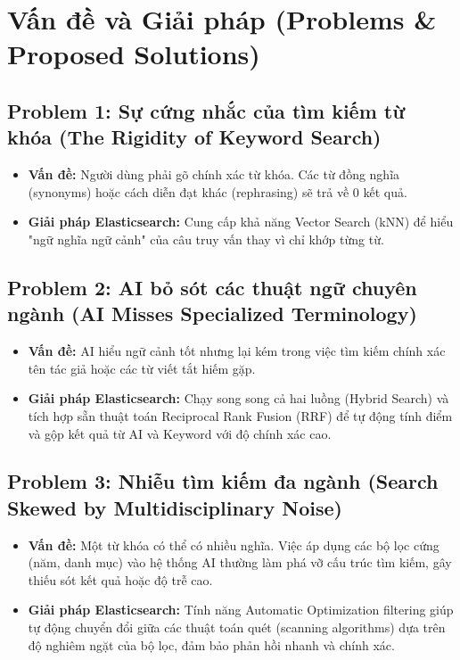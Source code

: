 \chapter{Vấn đề và Giải pháp (Problems \& Proposed Solutions)}

\section{Problem 1: Sự cứng nhắc của tìm kiếm từ khóa (The Rigidity of Keyword Search)}
\begin{itemize}
    \item \textbf{Vấn đề:} Người dùng phải gõ chính xác từ khóa. Các từ đồng nghĩa (synonyms) hoặc cách diễn đạt khác (rephrasing) sẽ trả về 0 kết quả.
    \item \textbf{Giải pháp Elasticsearch:} Cung cấp khả năng Vector Search (kNN) để hiểu "ngữ nghĩa ngữ cảnh" của câu truy vấn thay vì chỉ khớp từng từ.
\end{itemize}

\section{Problem 2: AI bỏ sót các thuật ngữ chuyên ngành (AI Misses Specialized Terminology)}
\begin{itemize}
    \item \textbf{Vấn đề:} AI hiểu ngữ cảnh tốt nhưng lại kém trong việc tìm kiếm chính xác tên tác giả hoặc các từ viết tắt hiếm gặp.
    \item \textbf{Giải pháp Elasticsearch:} Chạy song song cả hai luồng (Hybrid Search) và tích hợp sẵn thuật toán Reciprocal Rank Fusion (RRF) để tự động tính điểm và gộp kết quả từ AI và Keyword với độ chính xác cao.
\end{itemize}

\section{Problem 3: Nhiễu tìm kiếm đa ngành (Search Skewed by Multidisciplinary Noise)}
\begin{itemize}
    \item \textbf{Vấn đề:} Một từ khóa có thể có nhiều nghĩa. Việc áp dụng các bộ lọc cứng (năm, danh mục) vào hệ thống AI thường làm phá vỡ cấu trúc tìm kiếm, gây thiếu sót kết quả hoặc độ trễ cao.
    \item \textbf{Giải pháp Elasticsearch:} Tính năng Automatic Optimization filtering giúp tự động chuyển đổi giữa các thuật toán quét (scanning algorithms) dựa trên độ nghiêm ngặt của bộ lọc, đảm bảo phản hồi nhanh và chính xác.
\end{itemize}